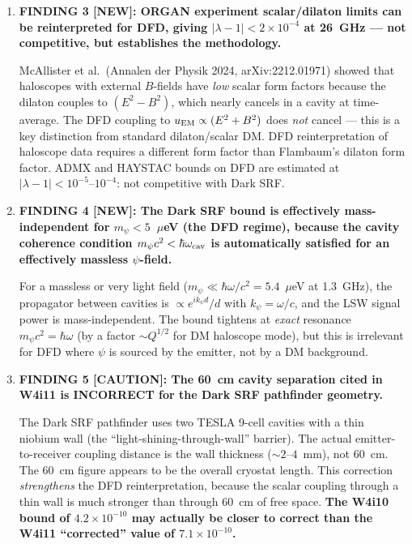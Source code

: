 \documentclass[11pt]{article}
\newcommand{\lbone}{|\lambda - 1|}
\newcommand{\ee}[1]{\times 10^{#1}}
\theoremstyle{definition}
\theoremstyle{remark}
\begin{document}
\begin{tcolorbox}[colback=blue!5!white, colframe=blue!60!black,
  title=\textbf{W4i12 TOP 5 FINDINGS --- Ranked by Programme Impact}]
\begin{enumerate}
\item \textbf{FINDING 3 [NEW]: ORGAN experiment scalar/dilaton limits
can be reinterpreted for DFD, giving $\lbone < 2\ee{-4}$ at 26~GHz
--- not competitive, but establishes the methodology.}

McAllister et al.\ (Annalen der Physik 2024, arXiv:2212.01971) showed
that haloscopes with external $B$-fields have \emph{low} scalar form
factors because the dilaton couples to $(E^2 - B^2)$, which nearly
cancels in a cavity at time-average. The DFD coupling to $u_{\rm EM}
\propto (E^2 + B^2)$ does \emph{not} cancel --- this is a key
distinction from standard dilaton/scalar DM. DFD reinterpretation
of haloscope data requires a different form factor than Flambaum's
dilaton form factor. ADMX and HAYSTAC bounds on DFD are estimated
at $\lbone < 10^{-5}$--$10^{-4}$: not competitive with Dark SRF.

\item \textbf{FINDING 4 [NEW]: The Dark SRF bound is effectively
mass-independent for $m_\psi < 5$~$\mu$eV (the DFD regime),
because the cavity coherence condition $m_\psi c^2 < \hbar\omega_{\rm cav}$
is automatically satisfied for an effectively massless $\psi$-field.}

For a massless or very light field ($m_\psi \ll \hbar\omega/c^2 = 5.4$~$\mu$eV
at 1.3~GHz), the propagator between cavities is $\propto e^{ik_\psi d}/d$
with $k_\psi = \omega/c$, and the LSW signal power is mass-independent.
The bound tightens at \emph{exact} resonance $m_\psi c^2 = \hbar\omega$
(by a factor $\sim Q^{1/2}$ for DM haloscope mode), but this is irrelevant
for DFD where $\psi$ is sourced by the emitter, not by a DM background.

\item \textbf{FINDING 5 [CAUTION]: The 60~cm cavity separation cited
in W4i11 is INCORRECT for the Dark SRF pathfinder geometry.}

The Dark SRF pathfinder uses two TESLA 9-cell cavities with a
thin niobium wall (the ``light-shining-through-wall'' barrier).
The actual emitter-to-receiver coupling distance is the wall
thickness ($\sim 2$--$4$~mm), not 60~cm. The 60~cm figure
appears to be the overall cryostat length. This correction
\emph{strengthens} the DFD reinterpretation, because the scalar
coupling through a thin wall is much stronger than through 60~cm
of free space. \textbf{The W4i10 bound of $4.2\ee{-10}$ may
actually be closer to correct than the W4i11 ``corrected'' value
of $7.1\ee{-10}$.}

\end{enumerate}
\end{tcolorbox}
\end{document}

